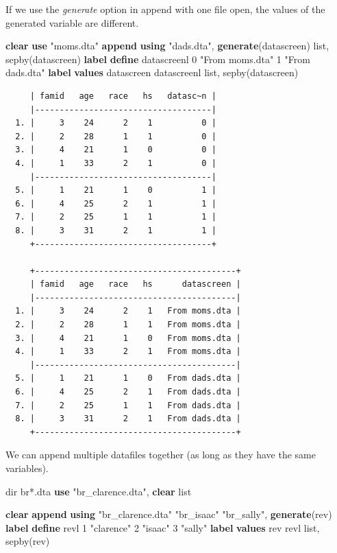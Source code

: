 \documentclass[
]{book}
\newenvironment{Shaded}{\begin{snugshade}}{\end{snugshade}}
\newcommand{\KeywordTok}[1]{\textcolor[rgb]{0.13,0.29,0.53}{\textbf{#1}}}
\newcommand{\NormalTok}[1]{#1}
\newcommand{\OtherTok}[1]{\textcolor[rgb]{0.56,0.35,0.01}{#1}}
\newcommand{\StringTok}[1]{\textcolor[rgb]{0.31,0.60,0.02}{#1}}
\begin{document}
If we use the \emph{generate} option in append with one file open, the values of the generated variable are different.

\begin{Shaded}
\begin{Highlighting}[]
\KeywordTok{clear}
\KeywordTok{use} \StringTok{"moms.dta"}
\KeywordTok{append} \KeywordTok{using} \StringTok{"dads.dta"}\NormalTok{, }\KeywordTok{generate}\NormalTok{(datascreen)}
\OtherTok{list}\NormalTok{, sepby(datascreen)}
\KeywordTok{label} \KeywordTok{define}\NormalTok{ datascreenl 0 }\StringTok{"From moms.dta"}\NormalTok{ 1 }\StringTok{"From dads.dta"}
\KeywordTok{label} \KeywordTok{values}\NormalTok{ datascreen datascreenl}
\OtherTok{list}\NormalTok{, sepby(datascreen)}
\end{Highlighting}
\end{Shaded}

\begin{verbatim}
     | famid   age   race   hs   datasc~n |
     |------------------------------------|
  1. |     3    24      2    1          0 |
  2. |     2    28      1    1          0 |
  3. |     4    21      1    0          0 |
  4. |     1    33      2    1          0 |
     |------------------------------------|
  5. |     1    21      1    0          1 |
  6. |     4    25      2    1          1 |
  7. |     2    25      1    1          1 |
  8. |     3    31      2    1          1 |
     +------------------------------------+

     +-----------------------------------------+
     | famid   age   race   hs      datascreen |
     |-----------------------------------------|
  1. |     3    24      2    1   From moms.dta |
  2. |     2    28      1    1   From moms.dta |
  3. |     4    21      1    0   From moms.dta |
  4. |     1    33      2    1   From moms.dta |
     |-----------------------------------------|
  5. |     1    21      1    0   From dads.dta |
  6. |     4    25      2    1   From dads.dta |
  7. |     2    25      1    1   From dads.dta |
  8. |     3    31      2    1   From dads.dta |
     +-----------------------------------------+
\end{verbatim}

We can append multiple datafiles together (as long as they have the same variables).

\begin{Shaded}
\begin{Highlighting}[]
\OtherTok{dir}\NormalTok{ br*.dta}
\KeywordTok{use} \StringTok{"br\_clarence.dta"}\NormalTok{, }\KeywordTok{clear}
\OtherTok{list}

\KeywordTok{clear}
\KeywordTok{append} \KeywordTok{using} \StringTok{"br\_clarence.dta"} \StringTok{"br\_isaac"} \StringTok{"br\_sally"}\NormalTok{, }\KeywordTok{generate}\NormalTok{(rev)}
\KeywordTok{label} \KeywordTok{define}\NormalTok{ revl 1 }\StringTok{"clarence"}\NormalTok{ 2 }\StringTok{"isaac"}\NormalTok{ 3 }\StringTok{"sally"}
\KeywordTok{label} \KeywordTok{values}\NormalTok{ rev revl}
\OtherTok{list}\NormalTok{, sepby(rev)}
\end{Highlighting}
\end{Shaded}
\end{document}
